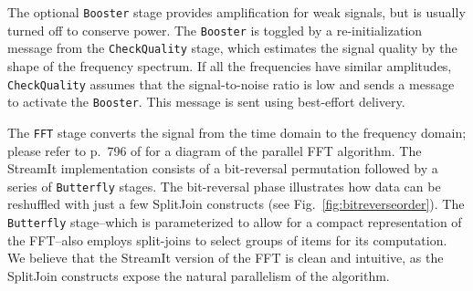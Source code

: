 The optional \texttt{Booster} stage provides amplification for weak
signals, but is usually turned off to conserve power.  The
\texttt{Booster} is toggled by a re-initialization message from the
\texttt{CheckQuality} stage, which estimates the signal quality by the
shape of the frequency spectrum.  If all the frequencies have similar
amplitudes, \texttt{CheckQuality} assumes that the signal-to-noise
ratio is low and sends a message to activate the \texttt{Booster}.
This message is sent using best-effort delivery.

The \texttt{FFT} stage converts the signal from the time domain to the
frequency domain; please refer to p.~796 of \cite{clr} for a diagram
of the parallel FFT algorithm.  The StreamIt implementation consists
of a bit-reversal permutation followed by a series of
\texttt{Butterfly} stages.  The bit-reversal phase illustrates how
data can be reshuffled with just a few SplitJoin constructs (see
Fig.~\ref{fig:bitreverseorder}).  The \texttt{Butterfly}
stage--which is parameterized to allow for a compact representation of
the FFT--also employs split-joins to select groups of items for its
computation.  We believe that the StreamIt version of the FFT is clean
and intuitive, as the SplitJoin constructs expose the natural
parallelism of the algorithm.

